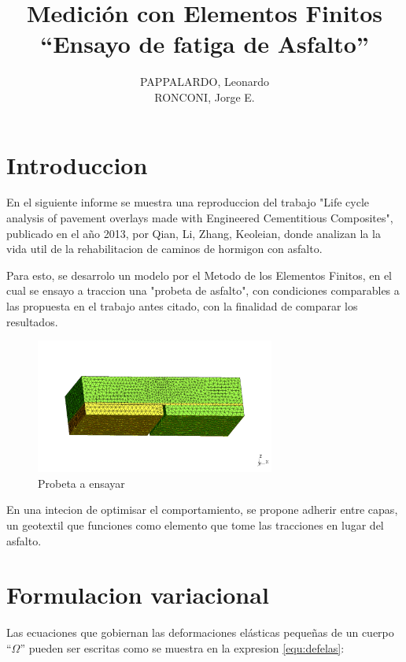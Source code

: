 \documentclass[12pt, a4paper]{article}
\begin{document}
 
 
\title{ Medición con Elementos Finitos \\ “Ensayo de fatiga de Asfalto” }
\author{PAPPALARDO, Leonardo \\ RONCONI, Jorge E.}
 
\maketitle

\section{Introduccion}
		
En el siguiente informe se muestra una reproduccion del trabajo "Life cycle analysis of pavement overlays made with Engineered Cementitious Composites", publicado en el año 2013, por Qian, Li, Zhang, Keoleian,  donde analizan la la vida util de la rehabilitacion de caminos de hormigon con asfalto.

Para esto, se desarrolo un modelo por el Metodo de los Elementos Finitos, en el cual se ensayo a traccion una "probeta de asfalto", con condiciones comparables a las propuesta en el trabajo antes citado, con la finalidad de comparar los resultados.

\begin{figure}[h]
	\centering
	\includegraphics[width=0.7\textwidth]{img/modelo.png}
	\caption{Probeta a ensayar}
	\label{fig:modelo}
\end{figure}

En una intecion de optimisar el comportamiento, se propone adherir entre capas, un geotextil que funciones como elemento que tome las tracciones en lugar del asfalto.

\section{Formulacion variacional}
Las ecuaciones que gobiernan las deformaciones elásticas pequeñas de un cuerpo “$\Omega$” pueden ser escritas como se muestra en la expresion \ref{equ:defelas}:
\end{document}
